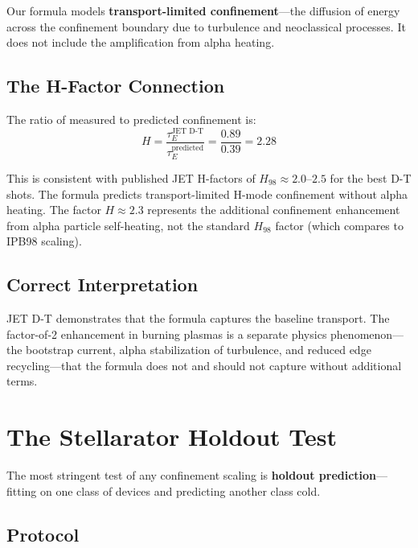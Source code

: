 \documentclass[11pt,letterpaper]{article}
\newcommand{\tauE}{\tau_E}
\begin{document}
Our formula models \textbf{transport-limited confinement}---the diffusion of energy across the confinement boundary due to turbulence and neoclassical processes. It does not include the amplification from alpha heating.

\subsection{The H-Factor Connection}

The ratio of measured to predicted confinement is:
\begin{equation}
H = \frac{\tauE^{\text{JET D-T}}}{\tauE^{\text{predicted}}} = \frac{0.89}{0.39} = 2.28
\end{equation}

This is consistent with published JET H-factors of $H_{98} \approx 2.0$--$2.5$ for the best D-T shots. The formula predicts transport-limited H-mode confinement without alpha heating. The factor $H \approx 2.3$ represents the additional confinement enhancement from alpha particle self-heating, not the standard $H_{98}$ factor (which compares to IPB98 scaling).

\subsection{Correct Interpretation}

JET D-T demonstrates that the formula captures the baseline transport. The factor-of-2 enhancement in burning plasmas is a separate physics phenomenon---the bootstrap current, alpha stabilization of turbulence, and reduced edge recycling---that the formula does not and should not capture without additional terms.

\section{The Stellarator Holdout Test}

The most stringent test of any confinement scaling is \textbf{holdout prediction}---fitting on one class of devices and predicting another class cold.

\subsection{Protocol}
\end{document}

